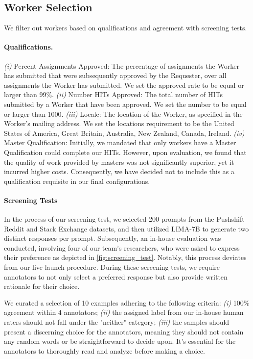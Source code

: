 \subsection{Worker Selection}
We filter out workers based on qualifications and agreement with screening tests. 

\paragraph{Qualifications.}
\textit{(i)} Percent Assignments Approved: The percentage of assignments the Worker has submitted that were subsequently approved by the Requester, over all assignments the Worker has submitted. We set the approved rate to be equal or larger than 99\%.
\textit{(ii)} Number HITs Approved: The total number of HITs submitted by a Worker that have been approved. We set the number to be equal or larger than 1000.
\textit{(iii)} Locale: The location of the Worker, as specified in the Worker's mailing address. We set the locations requirement to be the United States of America, Great Britain, Australia, New Zealand, Canada, Ireland.
\textit{(iv)} Master Qualification: Initially, we mandated that only workers have a Master Qualification could complete our HITs. However, upon evaluation, we found that the quality of work provided by masters was not significantly superior, yet it incurred higher costs. Consequently, we have decided not to include this as a qualification requisite in our final configurations.

\paragraph{Screening Tests}

In the process of our screening test, we selected 200 prompts from the Pushshift Reddit and Stack Exchange datasets, and then utilized LIMA-7B \cite{zhou2023lima} to generate two distinct responses per prompt. Subsequently, an in-house evaluation was conducted, involving four of our team's researchers, who were asked to express their preference as depicted in \autoref{fig:screening_test}. Notably, this process deviates from our live launch procedure. During these screening tests, we require annotators to not only select a preferred response but also provide written rationale for their choice.


We curated a selection of 10 examples adhering to the following criteria: \textit{(i)} 100\% agreement within 4 annotators; \textit{(ii)} the assigned label from our in-house human raters should not fall under the "neither" category; \textit{(iii)} the samples should present a discerning choice for the annotators, meaning they should not contain any random words or be straightforward to decide upon. It's essential for the annotators to thoroughly read and analyze before making a choice.

